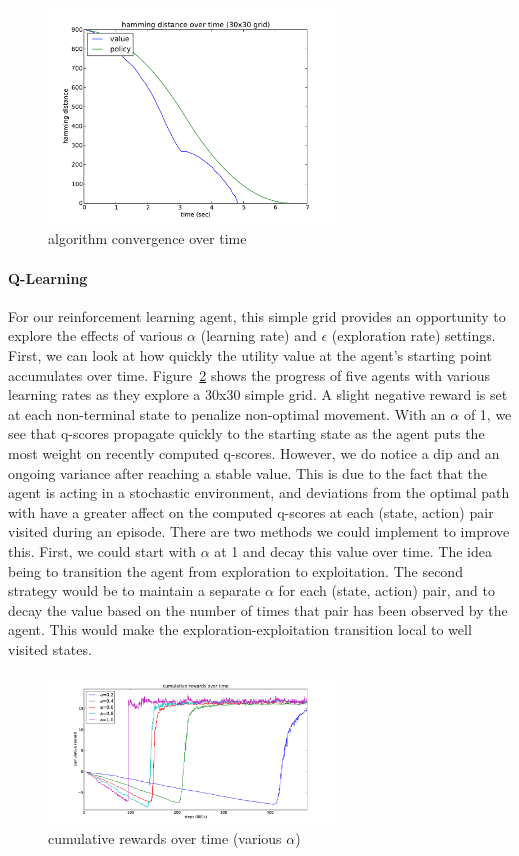 \documentclass{sig-alternate}
\begin{document}
\begin{figure}[!htbp]
    \centering
    \includegraphics[width=3in]{images/simple/hd.pdf}
    \caption{algorithm convergence over time \label{simple-hd}}
\end{figure} 

\paragraph{Q-Learning}

For our reinforcement learning agent, this simple grid provides an opportunity to explore the effects of various $\alpha$ (learning rate) and $\epsilon$ (exploration rate) settings. First, we can look at how quickly the utility value at the agent's starting point accumulates over time. Figure~\ref{simple-q-alpha} shows the progress of five agents with various learning rates as they explore a 30x30 simple grid. A slight negative reward is set at each non-terminal state to penalize non-optimal movement. With an $\alpha$ of 1, we see that q-scores propagate quickly to the starting state as the agent puts the most weight on recently computed q-scores. However, we do notice a dip and an ongoing variance after reaching a stable value. This is due to the fact that the agent is acting in a stochastic environment, and deviations from the optimal path with have a greater affect on the computed q-scores at each (state, action) pair visited during an episode. There are two methods we could implement to improve this. First, we could start with $\alpha$ at 1 and decay this value over time. The idea being to transition the agent from exploration to exploitation. The second strategy would be to maintain a separate $\alpha$ for each (state, action) pair, and to decay the value based on the number of times that pair has been observed by the agent. This would make the exploration-exploitation transition local to well visited states.


\begin{figure}[!htbp]
    \centering
    \includegraphics[width=3in]{images/simple/q-alpha.pdf}
    \caption{cumulative rewards over time (various $\alpha$) \label{simple-q-alpha}}
\end{figure} 
\end{document}
